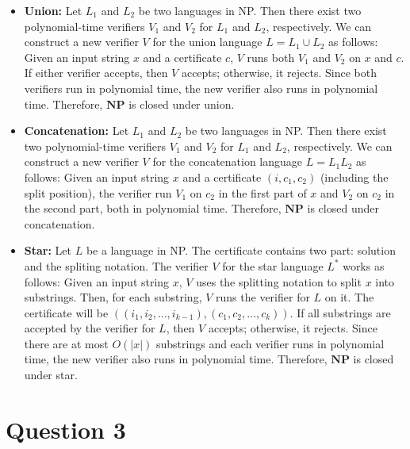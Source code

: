 \documentclass[a4paper, UTF-8]{article}
\theoremstyle{plain}
\begin{document}
\begin{itemize}
  \item \textbf{Union:} Let $L_1$ and $L_2$ be two languages in NP. Then there exist two polynomial-time verifiers $V_1$ and $V_2$ for $L_1$ and $L_2$, respectively. We can construct a new verifier $V$ for the union language $L = L_1 \cup L_2$ as follows: Given an input string $x$ and a certificate $c$, $V$ runs both $V_1$ and $V_2$ on $x$ and $c$. If either verifier accepts, then $V$ accepts; otherwise, it rejects. Since both verifiers run in polynomial time, the new verifier also runs in polynomial time. Therefore, $\textbf{NP}$ is closed under union.
  \item \textbf{Concatenation:} Let $L_1$ and $L_2$ be two languages in NP. Then there exist two polynomial-time verifiers $V_1$ and $V_2$ for $L_1$ and $L_2$, respectively. We can construct a new verifier $V$ for the concatenation language $L = L_1 L_2$ as follows: Given an input string $x$ and a certificate $(i, c_1, c_2)$ (including the split position), the verifier run $V_1$ on $c_2$ in the first part of $x$ and $V_2$ on $c_2$ in the second part, both in polynomial time. Therefore, $\textbf{NP}$ is closed under concatenation.
  \item \textbf{Star:} Let $L$ be a language in NP. The certificate contains two part: solution and the spliting notation. The verifier $V$ for the star language $L^*$ works as follows: Given an input string $x$, $V$ uses the splitting notation to split $x$ into substrings. Then, for each substring, $V$ runs the verifier for $L$ on it. The certificate will be $((i_1, i_2, \ldots, i_{k-1}), (c_1, c_2, \ldots, c_{k}))$. If all substrings are accepted by the verifier for $L$, then $V$ accepts; otherwise, it rejects. Since there are at most $O(|x|)$ substrings and each verifier runs in polynomial time, the new verifier also runs in polynomial time. Therefore, $\textbf{NP}$ is closed under star.
\end{itemize}

\section{Question 3} 
\end{document}
